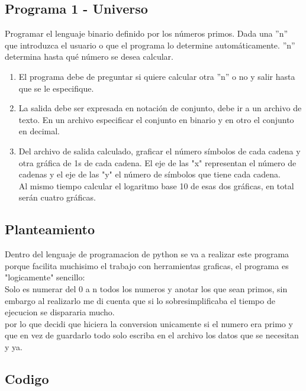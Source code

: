 \documentclass{article}
\begin{document}
\subsection{Programa 1 - Universo}
Programar el lenguaje binario definido por los números primos. Dada una ”n” que introduzca el usuario o que
el programa lo determine automáticamente. ”n” determina hasta qué número se desea calcular.
\begin{enumerate}
    \item El programa debe de preguntar si quiere calcular otra ”n” o no y salir hasta que se le especifique.   
    \item La salida debe ser expresada en notación de conjunto, debe ir a un archivo de texto. En un archivo
    especificar el conjunto en binario y en otro el conjunto en decimal.
    \item Del archivo de salida calculado, graficar el número símbolos de cada cadena y otra gráfica de 1s de cada cadena. El eje de las "x" representan el número de cadenas y el eje de las "y" el número de símbolos que tiene cada cadena. 
    \\Al mismo tiempo calcular el logaritmo base 10 de esas dos gráficas, en total serán cuatro gráficas.
\end{enumerate} 

\subsection{Planteamiento}
Dentro del lenguaje de programacion de python se va a realizar este programa porque facilita muchisimo el trabajo con herramientas graficas, el programa es "logicamente" sencillo:
\\Solo es numerar del 0 a n todos los numeros y anotar los que sean primos, sin embargo al realizarlo me di cuenta que si lo sobresimplificaba el tiempo de ejecucion se dispararia mucho.
\\por lo que decidi que hiciera la conversion unicamente si el numero era primo y que en vez de guardarlo todo solo escriba en el archivo los datos que se necesitan y ya.
\subsection{Codigo}
\end{document}
